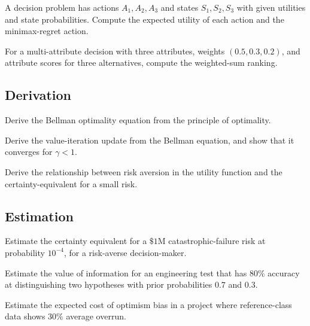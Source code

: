 \begin{exercise}
A decision problem has actions $A_1, A_2, A_3$ and states $S_1, S_2, S_3$ with given utilities and state probabilities. Compute the expected utility of each action and the minimax-regret action.
\end{exercise}

\begin{exercise}
For a multi-attribute decision with three attributes, weights $(0.5, 0.3, 0.2)$, and attribute scores for three alternatives, compute the weighted-sum ranking.
\end{exercise}

\subsection*{Derivation}

\begin{exercise}
Derive the Bellman optimality equation from the principle of optimality.
\end{exercise}

\begin{exercise}
Derive the value-iteration update from the Bellman equation, and show that it converges for $\gamma < 1$.
\end{exercise}

\begin{exercise}
Derive the relationship between risk aversion in the utility function and the certainty-equivalent for a small risk.
\end{exercise}

\subsection*{Estimation}

\begin{exercise}
Estimate the certainty equivalent for a $\$1\text{M}$ catastrophic-failure risk at probability $10^{-4}$, for a risk-averse decision-maker.
\end{exercise}

\begin{exercise}
Estimate the value of information for an engineering test that has $80\%$ accuracy at distinguishing two hypotheses with prior probabilities $0.7$ and $0.3$.
\end{exercise}

\begin{exercise}
Estimate the expected cost of optimism bias in a project where reference-class data shows $30\%$ average overrun.
\end{exercise}

